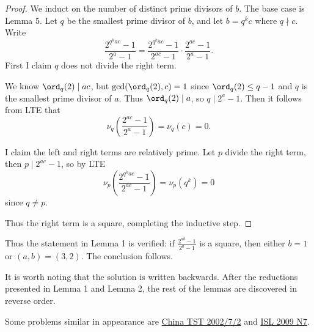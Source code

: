 \begin{proof}
    We induct on the number of distinct prime divisors of $b$. The base case is Lemma 5. Let $q$ be the smallest prime divisor of $b$, and let $b=q^kc$ where $q\nmid c$. Write \[\frac{2^{q^kac}-1}{2^a-1}=\frac{2^{q^kac}-1}{2^{ac}-1}\cdot\frac{2^{ac}-1}{2^a-1}.\]
    First I claim $q$ does not divide the right term.

    We know $\ord_q(2)\mid ac$, but $\gcd(\ord_q(2),c)=1$ since $\ord_q(2)\le q-1$ and $q$ is the smallest prime divisor of $a$. Thus $\ord_q(2)\mid a$, so $q\mid2^a-1$. Then it follows from LTE that \[\nu_q\left(\frac{2^{ac}-1}{2^a-1}\right)=\nu_q(c)=0.\]

    I claim the left and right terms are relatively prime. Let $p$ divide the right term, then $p\mid2^{ac}-1$, so by LTE \[\nu_p\left(\frac{2^{q^kac}-1}{2^{ac}-1}\right)=\nu_p\left(q^k\right)=0\]
    since $q\ne p$.

    Thus the right term is a square, completing the inductive step.
\end{proof}

Thus the statement in Lemma 1 is verified: if $\tfrac{2^{ab}-1}{2^a-1}$ is a square, then either $b=1$ or $(a,b)=(3,2)$. The conclusion follows.
\begin{boxremark}
    It is worth noting that the solution is written backwards. After the reductions presented in Lemma 1 and Lemma 2, the rest of the lemmas are discovered in reverse order.
\end{boxremark}
\begin{boxremark}
    Some problems similar in appearance are \href{https://artofproblemsolving.com/community/c6h254153p1389586}{China TST 2002/7/2} and \href{https://artofproblemsolving.com/community/c6h355801p1932947}{ISL 2009 N7}.
\end{boxremark}


